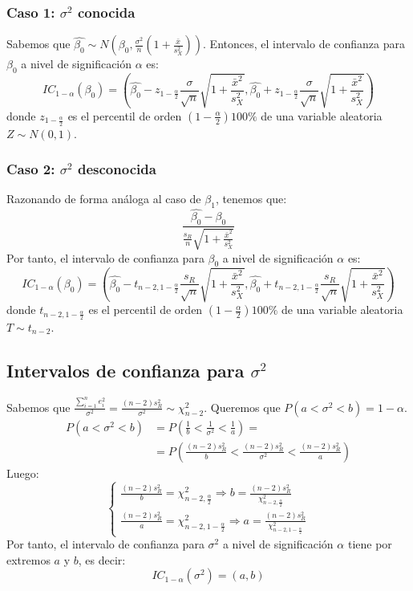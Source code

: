 \documentclass{report}
\theoremstyle{remark}
\theoremstyle{remark}
\theoremstyle{remark}
\theoremstyle{definition}
\theoremstyle{definition}
\theoremstyle{definition}
\begin{document}
\subsubsection*{Caso 1: $\sigma^2$ conocida}
Sabemos que $\hat{\beta_0} \sim N\left( \beta_0, \frac{\sigma^2}{n} \left( 1 + \frac{\bar{x}}{s_X^2} \right) \right)$.
Entonces, el intervalo de confianza para $\beta_0$ a nivel de significación $\alpha$ es:
$$IC_{1-\alpha}(\beta_0) = \left( \hat{\beta_0} - z_{1-\frac{\alpha}{2}} \frac{\sigma}{\sqrt{n}} \sqrt{1 + \frac{\bar{x}^2}{s_X^2}}, \hat{\beta_0} + z_{1-\frac{\alpha}{2}} \frac{\sigma}{\sqrt{n}} \sqrt{1 + \frac{\bar{x}^2}{s_X^2}} \right)$$
donde $z_{1-\frac{\alpha}{2}}$ es el percentil de orden $(1 - \frac{\alpha}{2}) 100\%$ de una variable aleatoria $Z \sim N(0, 1)$.

\subsubsection*{Caso 2: $\sigma^2$ desconocida}
Razonando de forma análoga al caso de $\beta_1$, tenemos que:
$$\frac{\hat{\beta_0} - \beta_0}{\frac{s_R}{n} \sqrt{1 + \frac{\bar{x}^2}{s_X^2}}}$$
Por tanto, el intervalo de confianza para $\beta_0$ a nivel de significación $\alpha$ es:
$$IC_{1-\alpha}(\beta_0) = \left( \hat{\beta_0} - t_{n-2, 1-\frac{\alpha}{2}} \frac{s_R}{\sqrt{n}} \sqrt{1 + \frac{\bar{x}^2}{s_X^2}}, \hat{\beta_0} + t_{n-2, 1-\frac{\alpha}{2}} \frac{s_R}{\sqrt{n}} \sqrt{1 + \frac{\bar{x}^2}{s_X^2}} \right)$$
donde $t_{n-2, 1-\frac{\alpha}{2}}$ es el percentil de orden $(1 - \frac{\alpha}{2}) 100\%$ de una variable aleatoria $T \sim t_{n-2}$.

\subsection*{Intervalos de confianza para $\sigma^2$}
Sabemos que $\frac{\sum_{i=1}^n e_i^2}{\sigma^2} = \frac{(n-2)s_R^2}{\sigma^2} \sim \chi^2_{n-2}$.
Queremos que $P(a < \sigma^2 < b) = 1-\alpha$.
\begin{align*}
    P(a < \sigma^2 < b) & = P\left( \frac{1}{b} < \frac{1}{\sigma^2} < \frac{1}{a} \right) =                          \\
                        & = P\left( \frac{(n-2)s_R^2}{b} < \frac{(n-2)s_R^2}{\sigma^2} < \frac{(n-2)s_R^2}{a} \right)
\end{align*}
Luego:
$$\begin{cases}
        \frac{(n-2)s_R^2}{b} = \chi^2_{n-2, \frac{\alpha}{2}} \Rightarrow b = \frac{(n-2)s_R^2}{\chi^2_{n-2, \frac{\alpha}{2}}} \\
        \frac{(n-2)s_R^2}{a} = \chi^2_{n-2, 1 - \frac{\alpha}{2}} \Rightarrow a = \frac{(n-2)s_R^2}{\chi^2_{n-2, 1 - \frac{\alpha}{2}}}
    \end{cases}$$
Por tanto, el intervalo de confianza para $\sigma^2$ a nivel de significación $\alpha$ tiene por extremos $a$ y $b$, es decir:
$$IC_{1-\alpha}(\sigma^2) = (a, b)$$
\end{document}
